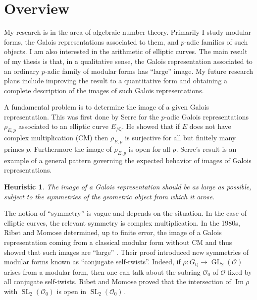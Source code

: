 \documentclass[12pt]{article}
\newcommand{\OK}{\ensuremath{\mathcal{O}}}
\newcommand{\Q}{\mathbb{Q}}
\newtheorem*{heuristic}{Heuristic}
\theoremstyle{definition}
\DeclareMathOperator{\GL}{GL}
\DeclareMathOperator{\im}{Im}
\DeclareMathOperator{\SL}{SL}
\begin{document}
\section*{Overview}
My research is in the area of algebraic number theory.  Primarily I study modular forms, the Galois representations associated to them, and $p$-adic families of such objects.  I am also interested in the arithmetic of elliptic curves.  The main result of my thesis is that, in a qualitative sense, the Galois representation associated to an ordinary $p$-adic family of modular forms has ``large'' image.  My future research plans include improving the result to a quantitative form and obtaining a complete description of the images of such Galois representations.  


A fundamental problem is to determine the image of a given Galois representation.  This was first done by Serre \cite{Serre68} for the $p$-adic Galois representations $\rho_{E, p}$ associated to an elliptic curve $E_{/\Q}$.  He showed that if $E$ does not have complex multiplication (CM) then $\rho_{E, p}$ is surjective for all but finitely many primes $p$.  Furthermore the image of $\rho_{E, p}$ is open for all $p$.  Serre's result is an example of a general pattern governing the expected behavior of images of Galois representations.

\begin{heuristic}
The image of a Galois representation should be as large as possible, subject to the symmetries of the geometric object from which it arose.
\end{heuristic}

The notion of ``symmetry'' is vague and depends on the situation.  In the case of elliptic curves, the relevant symmetry is complex multiplication.  In the 1980s, Ribet and Momose determined, up to finite error, the image of a Galois representation coming from a classical modular form without CM and thus showed that such images are ``large'' \cite{Momose81, Ribet83}.  Their proof introduced new symmetries of modular forms known as ``conjugate self-twists''.  Indeed, if $\rho: G_\Q \to \GL_2(\OK)$ arises from a modular form, then one can talk about the subring $\OK_0$ of $\OK$ fixed by all conjugate self-twists.  Ribet and Momose proved that the intersection of $\im \rho$ with $\SL_2(\OK_0)$ is open in $\SL_2(\OK_0)$.    
\end{document}
